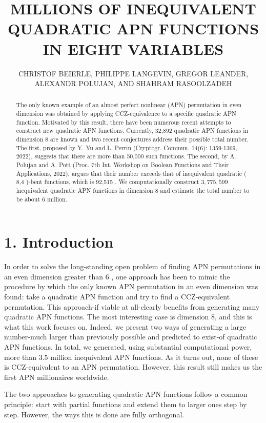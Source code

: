 \documentclass[10pt]{article}
\title{MILLIONS OF INEQUIVALENT QUADRATIC APN FUNCTIONS IN EIGHT VARIABLES }
\author{CHRISTOF BEIERLE, PHILIPPE LANGEVIN, GREGOR LEANDER, ALEXANDR POLUJAN, AND SHAHRAM RASOOLZADEH}
\date{}
\begin{document}
\maketitle


\begin{abstract}
The only known example of an almost perfect nonlinear (APN) permutation in even dimension was obtained by applying CCZ-equivalence to a specific quadratic APN function. Motivated by this result, there have been numerous recent attempts to construct new quadratic APN functions. Currently, 32,892 quadratic APN functions in dimension 8 are known and two recent conjectures address their possible total number. The first, proposed by Y. Yu and L. Perrin (Cryptogr. Commun. 14(6): 1359-1369, 2022), suggests that there are more than 50,000 such functions. The second, by A. Polujan and A. Pott (Proc. 7th Int. Workshop on Boolean Functions and Their Applications, 2022), argues that their number exceeds that of inequivalent quadratic ( 8,4 )-bent functions, which is 92,515 . We computationally construct $3,775,599$ inequivalent quadratic APN functions in dimension 8 and estimate the total number to be about 6 million.
\end{abstract}

\section*{1. Introduction}
In order to solve the long-standing open problem of finding APN permutations in an even dimension greater than 6 , one approach has been to mimic the procedure by which the only known APN permutation in an even dimension was found: take a quadratic APN function and try to find a CCZ-equivalent permutation. This approach-if viable at all-clearly benefits from generating many quadratic APN functions. The most interesting case is dimension 8, and this is what this work focuses on. Indeed, we present two ways of generating a large number-much larger than previously possible and predicted to exist-of quadratic APN functions. In total, we generated, using substantial computational power, more than 3.5 million inequivalent APN functions. As it turns out, none of these is CCZ-equivalent to an APN permutation. However, this result still makes us the first APN millionaires worldwide.

The two approaches to generating quadratic APN functions follow a common principle: start with partial functions and extend them to larger ones step by step. However, the ways this is done are fully orthogonal.
\end{document}
